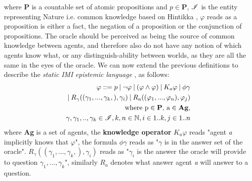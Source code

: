 where \textbf{P} is a countable set of atomic propositions and $p \in
	\mathbf{P}$, $\mathscr{I}$ is the entity representing Nature i.e. common knowledge
based on Hintikka \cite{hintikka88}, $\varphi$ reads as a proposition is either
a fact, the negation of a proposition or the conjunction of propositions. The oracle should be perceived as being the source of common knowledge between agents, and therefore also do not have any notion of which agents know what, or any distinguish-ability between worlds, as they are all the same in the eyes of the oracle.
We can now extend the previous definitions to describe the \textit{static IMI
	epistemic language} \staticlang, as follows:
\begin{align}
	\begin{split}
		\varphi ::= p \:|\:\neg\varphi\:|\:(\varphi \land \varphi) \:|\: K_a\varphi \:|\: \phi\gamma \\ \:|\: R_\gamma((\gamma_1,...,\gamma_k,), \gamma_i) \:|\: R_a((\varphi_1,...,\varphi_n), \varphi_j) \\ \text{where p} \in \text{\textbf{P}}\text{, a} \in \text{\textbf{Ag}},\\ \gamma, \gamma_1,..,\gamma_k \in \mathscr{I}, k, n \in \mathbb{N}, i \in 1..k, j \in 1..n
	\end{split}
\end{align}
where \textbf{Ag} is a set of agents, the \textbf{knowledge operator} $K_a\varphi$ reads "agent \textit{a} implicitly knows that $\varphi$", the formula $\phi\gamma$ reads as "$\gamma$ is in the answer set of the oracle". $R_\gamma((\gamma_1,...,\gamma_k,), \gamma_i)$ reads as "$\gamma_i$ is the answer the oracle will provide to question $\gamma_1,...,\gamma_k$", similarly $R_a$ denotes what answer agent \textit{a} will answer to a question. \\


